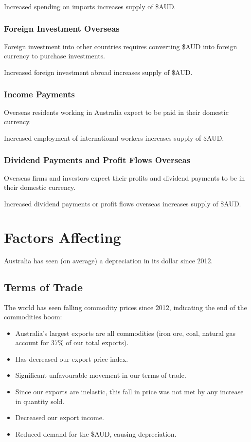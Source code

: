 \documentclass[a4paper,11pt]{article}
\begin{document}
Increased spending on imports increases supply of \$AUD.


\subsubsection{Foreign Investment Overseas}

Foreign investment into other countries requires converting \$AUD into foreign
currency to purchase investments.

Increased foreign investment abroad increases supply of \$AUD.


\subsubsection{Income Payments}

Overseas residents working in Australia expect to be paid in their domestic
currency.

Increased employment of international workers increases supply of \$AUD.


\subsubsection{Dividend Payments and Profit Flows Overseas}

Overseas firms and investors expect their profits and dividend payments to be
in their domestic currency.

Increased dividend payments or profit flows overseas increases supply of \$AUD.




\section{Factors Affecting}

Australia has seen (on average) a depreciation in its dollar since 2012.


\subsection{Terms of Trade}

The world has seen falling commodity prices since 2012, indicating the end of
the commodities boom:

\begin{itemize}
\item Australia's largest exports are all commodities (iron ore, coal, natural
	gas account for 37\% of our total exports).
\item Has decreased our export price index.
\item Significant unfavourable movement in our terms of trade.
\item Since our exports are inelastic, this fall in price was not met by any
	increase in quantity sold.
\item Decreased our export income.
\item Reduced demand for the \$AUD, causing depreciation.
\end{itemize}
\end{document}
